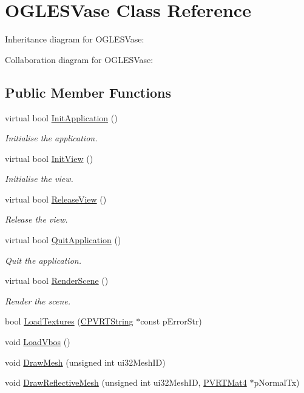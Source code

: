 \hypertarget{class_o_g_l_e_s_vase}{\section{O\+G\+L\+E\+S\+Vase Class Reference}
\label{class_o_g_l_e_s_vase}
}


Inheritance diagram for O\+G\+L\+E\+S\+Vase\+:


Collaboration diagram for O\+G\+L\+E\+S\+Vase\+:
\subsection*{Public Member Functions}
\begin{DoxyCompactItemize}
\item 
virtual bool \hyperlink{class_o_g_l_e_s_vase_a12e51ee306fa8cfe6e0d8002a07822c4}{Init\+Application} ()
\begin{DoxyCompactList}\small\item\em Initialise the application. \end{DoxyCompactList}\item 
virtual bool \hyperlink{class_o_g_l_e_s_vase_aeae9bba53c85389d0923c0324724954e}{Init\+View} ()
\begin{DoxyCompactList}\small\item\em Initialise the view. \end{DoxyCompactList}\item 
virtual bool \hyperlink{class_o_g_l_e_s_vase_aa0f2212e61339c97a2dbc716d649d1a4}{Release\+View} ()
\begin{DoxyCompactList}\small\item\em Release the view. \end{DoxyCompactList}\item 
virtual bool \hyperlink{class_o_g_l_e_s_vase_a66eea1218d3e0c9b4d42fc130a32d461}{Quit\+Application} ()
\begin{DoxyCompactList}\small\item\em Quit the application. \end{DoxyCompactList}\item 
virtual bool \hyperlink{class_o_g_l_e_s_vase_a8cd93f6ca5569a876a8a7b8782d743bf}{Render\+Scene} ()
\begin{DoxyCompactList}\small\item\em Render the scene. \end{DoxyCompactList}\item 
bool \hyperlink{class_o_g_l_e_s_vase_a8e7d07dd990171bb21b7df4a87349966}{Load\+Textures} (\hyperlink{class_c_p_v_r_t_string}{C\+P\+V\+R\+T\+String} $\ast$const p\+Error\+Str)
\item 
void \hyperlink{class_o_g_l_e_s_vase_aca19f6a1b754f678465eaff3d83f2f4b}{Load\+Vbos} ()
\item 
void \hyperlink{class_o_g_l_e_s_vase_ac7a4e7dee6d182ea447e0d2eddd6ecc0}{Draw\+Mesh} (unsigned int ui32\+Mesh\+I\+D)
\item 
void \hyperlink{class_o_g_l_e_s_vase_abf5fb03240ac6a64c9bbd73da5328a3c}{Draw\+Reflective\+Mesh} (unsigned int ui32\+Mesh\+I\+D, \hyperlink{struct_p_v_r_t_mat4}{P\+V\+R\+T\+Mat4} $\ast$p\+Normal\+Tx)
\end{DoxyCompactItemize}


